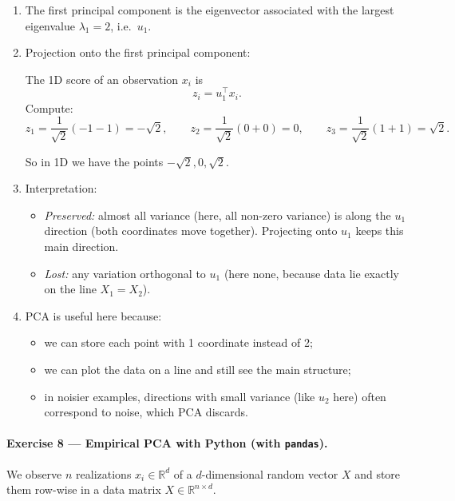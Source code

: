 \documentclass[11pt]{article}
\begin{document}
\begin{enumerate}
\item The first principal component is the eigenvector associated with the largest eigenvalue $\lambda_1=2$, i.e.\ $u_1$.

\item Projection onto the first principal component:

The 1D score of an observation $x_i$ is
\[
z_i = u_1^\top x_i.
\]
Compute:
\[
z_1 = \frac{1}{\sqrt{2}}(-1-1) = -\sqrt{2},\qquad
z_2 = \frac{1}{\sqrt{2}}(0+0) = 0,\qquad
z_3 = \frac{1}{\sqrt{2}}(1+1) = \sqrt{2}.
\]

So in 1D we have the points $-\sqrt{2}, 0, \sqrt{2}$.

\item Interpretation:
\begin{itemize}
\item \emph{Preserved:} almost all variance (here, all non-zero variance) is along the $u_1$ direction (both coordinates move together). Projecting onto $u_1$ keeps this main direction.
\item \emph{Lost:} any variation orthogonal to $u_1$ (here none, because data lie exactly on the line $X_1=X_2$).
\end{itemize}

\item PCA is useful here because:
\begin{itemize}
\item we can store each point with 1 coordinate instead of 2;
\item we can plot the data on a line and still see the main structure;
\item in noisier examples, directions with small variance (like $u_2$ here) often correspond to noise, which PCA discards.
\end{itemize}
\end{enumerate}

\bigskip
\paragraph{Exercise 8 — Empirical PCA with Python (with \texttt{pandas}).}

We observe $n$ realizations $x_i \in \mathbb{R}^d$ of a $d$-dimensional random vector $X$ and store them row-wise in a data matrix $X \in \mathbb{R}^{n\times d}$.
\end{document}
